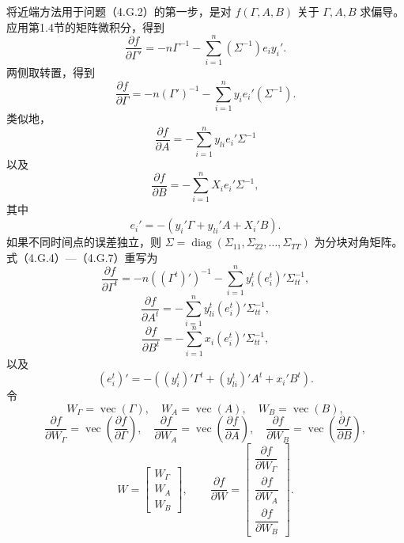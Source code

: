 将近端方法用于问题（4.G.2）的第一步，是对 $f(\Gamma,A,B)$ 关于 $\Gamma,A,B$ 求偏导。应用第1.4节的矩阵微积分，得到
\begin{equation}
\frac{\partial f}{\partial\Gamma'}=-n\Gamma^{-1}
-\sum_{i=1}^{n}(\Sigma^{-1})e_iy_i'.\tag{4.G.3}
\end{equation}
两侧取转置，得到
\begin{equation}
\frac{\partial f}{\partial\Gamma}=-n(\Gamma')^{-1}
-\sum_{i=1}^{n}y_ie_i'(\Sigma^{-1}).\tag{4.G.4}
\end{equation}
类似地，
\begin{equation}
\frac{\partial f}{\partial A}=-\sum_{i=1}^{n}y_{li}e_i'\Sigma^{-1}\tag{4.G.5}
\end{equation}
以及
\begin{equation}
\frac{\partial f}{\partial B}=-\sum_{i=1}^{n}X_ie_i'\Sigma^{-1},\tag{4.G.6}
\end{equation}
其中
\begin{equation}
e_i'=-(y_i'\Gamma+y_{li}'A+X_i'B).\tag{4.G.7}
\end{equation}
如果不同时间点的误差独立，则 $\Sigma=\operatorname{diag}(\Sigma_{11},\Sigma_{22},\ldots,\Sigma_{TT})$ 为分块对角矩阵。式（4.G.4）—（4.G.7）重写为
\begin{equation}
\frac{\partial f}{\partial\Gamma^t}=-n((\Gamma^t)')^{-1}
-\sum_{i=1}^{n}y_i^t(e_i^t)'\Sigma_{tt}^{-1},\tag{4.G.8}
\end{equation}
\begin{equation}
\frac{\partial f}{\partial A^t}=-\sum_{i=1}^{n}y_{li}^t(e_i^t)'\Sigma_{tt}^{-1},\tag{4.G.9}
\end{equation}
\begin{equation}
\frac{\partial f}{\partial B^t}=-\sum_{i=1}^{n}x_i(e_i^t)'\Sigma_{tt}^{-1},\tag{4.G.10}
\end{equation}
以及
\begin{equation}
(e_i^t)'=-((y_i^t)'\Gamma^t+(y_{li}^t)'A^t+x_i'B^t).\tag{4.G.11}
\end{equation}
令
\[
W_\Gamma=\operatorname{vec}(\Gamma),\quad
W_A=\operatorname{vec}(A),\quad W_B=\operatorname{vec}(B),
\]
\[
\frac{\partial f}{\partial W_\Gamma}=\operatorname{vec}\left(\frac{\partial f}{\partial\Gamma}\right),\quad
\frac{\partial f}{\partial W_A}=\operatorname{vec}\left(\frac{\partial f}{\partial A}\right),\quad
\frac{\partial f}{\partial W_B}=\operatorname{vec}\left(\frac{\partial f}{\partial B}\right),
\]
\begin{equation}
W=\begin{bmatrix}W_\Gamma\\W_A\\W_B\end{bmatrix},\qquad
\frac{\partial f}{\partial W}=\begin{bmatrix}
\dfrac{\partial f}{\partial W_\Gamma}\\
\dfrac{\partial f}{\partial W_A}\\
\dfrac{\partial f}{\partial W_B}
\end{bmatrix}.\tag{4.G.12}
\end{equation}
